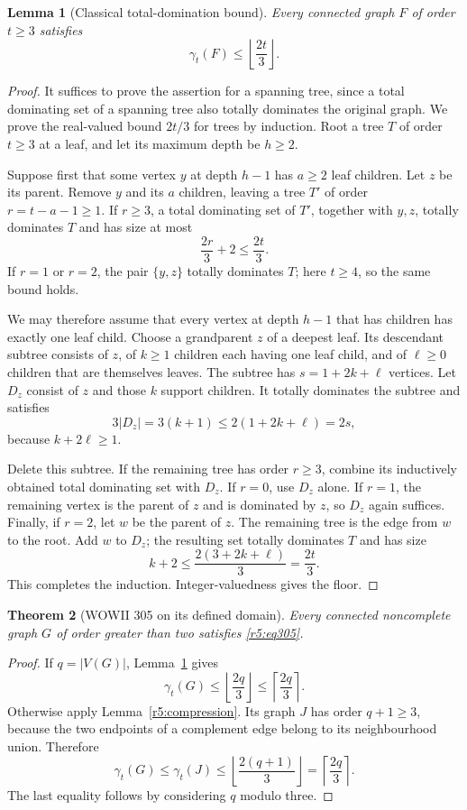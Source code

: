 \documentclass[11pt,a4paper]{article}
\newtheorem{theorem}{Theorem}[section]
\newtheorem{lemma}[theorem]{Lemma}
\theoremstyle{remark}
\begin{document}
\begin{lemma}[Classical total-domination bound]\label{r5:classicalTD}
Every connected graph \(F\) of order \(t\ge3\) satisfies
\[
\gamma_t(F)\le \left\lfloor\frac{2t}{3}\right\rfloor.
\]
\end{lemma}
\begin{proof}
It suffices to prove the assertion for a spanning tree, since a total
dominating set of a spanning tree also totally dominates the original
graph. We prove the real-valued bound \(2t/3\) for trees by induction.
Root a tree \(T\) of order \(t\ge3\) at a leaf, and let its maximum
depth be \(h\ge2\).

Suppose first that some vertex \(y\) at depth \(h-1\) has
\(a\ge2\) leaf children. Let \(z\) be its parent. Remove \(y\) and
its \(a\) children, leaving a tree \(T'\) of order
\(r=t-a-1\ge1\). If \(r\ge3\), a total dominating set of \(T'\),
together with \(y,z\), totally dominates \(T\) and has size at most
\[
\frac{2r}{3}+2\le\frac{2t}{3}.
\]
If \(r=1\) or \(r=2\), the pair \(\{y,z\}\) totally dominates \(T\);
here \(t\ge4\), so the same bound holds.

We may therefore assume that every vertex at depth \(h-1\) that has
children has exactly one leaf child. Choose a grandparent \(z\) of
a deepest leaf. Its descendant subtree consists of \(z\), of
\(k\ge1\) children each having one leaf child, and of \(\ell\ge0\)
children that are themselves leaves. The subtree has
\(s=1+2k+\ell\) vertices. Let \(D_z\) consist of \(z\) and those
\(k\) support children. It totally dominates the subtree and
satisfies
\[
3|D_z|=3(k+1)\le2(1+2k+\ell)=2s,
\]
because \(k+2\ell\ge1\).

Delete this subtree. If the remaining tree has order \(r\ge3\),
combine its inductively obtained total dominating set with \(D_z\).
If \(r=0\), use \(D_z\) alone. If \(r=1\), the remaining vertex is
the parent of \(z\) and is dominated by \(z\), so \(D_z\) again
suffices. Finally, if \(r=2\), let \(w\) be the parent of \(z\).
The remaining tree is the edge from \(w\) to the root. Add \(w\)
to \(D_z\); the resulting set totally dominates \(T\) and has size
\[
k+2\le \frac{2(3+2k+\ell)}{3}=\frac{2t}{3}.
\]
This completes the induction. Integer-valuedness gives the floor.
\end{proof}

\begin{theorem}[WOWII 305 on its defined domain]\label{r5:thm305}
Every connected noncomplete graph \(G\) of order greater than two
satisfies \eqref{r5:eq305}.
\end{theorem}
\begin{proof}
If \(q=|V(G)|\), Lemma~\ref{r5:classicalTD} gives
\[
\gamma_t(G)\le\left\lfloor\frac{2q}{3}\right\rfloor
             \le\left\lceil\frac{2q}{3}\right\rceil.
\]
Otherwise apply Lemma~\ref{r5:compression}. Its graph \(J\) has
order \(q+1\ge3\), because the two endpoints of a complement edge
belong to its neighbourhood union. Therefore
\[
\gamma_t(G)\le\gamma_t(J)
 \le\left\lfloor\frac{2(q+1)}{3}\right\rfloor
 =\left\lceil\frac{2q}{3}\right\rceil.
\]
The last equality follows by considering \(q\) modulo three.
\end{proof}
\end{document}
